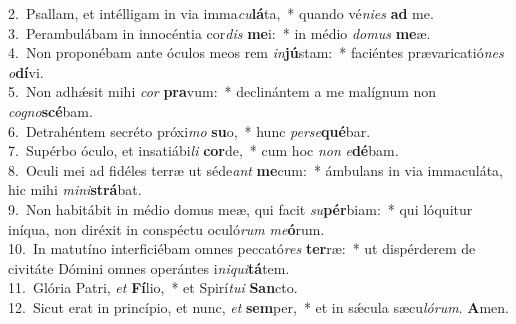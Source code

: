 {2.~}Psallam, et intélligam in via imma\textit{cu}\textbf{lá}ta,~* quando vé\textit{ni}\textit{es} \textbf{ad} me.\\
{3.~}Perambulábam in innocéntia cor\textit{dis} \textbf{me}i:~* in médio \textit{do}\textit{mus} \textbf{me}æ.\\
{4.~}Non proponébam ante óculos meos rem \textit{in}\textbf{jú}stam:~* faciéntes prævaricatió\textit{nes} \textit{o}\textbf{dí}vi.\\
{5.~}Non adhǽsit mihi \textit{cor} \textbf{pra}vum:~* declinántem a me malígnum non \textit{co}\textit{gno}\textbf{scé}bam.\\
{6.~}Detrahéntem secréto próxi\textit{mo} \textbf{su}o,~* hunc \textit{per}\textit{se}\textbf{qué}bar.\\
{7.~}Supérbo óculo, et insatiábi\textit{li} \textbf{cor}de,~* cum hoc \textit{non} \textit{e}\textbf{dé}bam.\\
{8.~}Oculi mei ad fidéles terræ ut séde\textit{ant} \textbf{me}cum:~* ámbulans in via immaculáta, hic mihi \textit{mi}\textit{ni}\textbf{strá}bat.\\
{9.~}Non habitábit in médio domus meæ, qui facit \textit{su}\textbf{pér}biam:~* qui lóquitur iníqua, non diréxit in conspéctu oculó\textit{rum} \textit{me}\textbf{ó}rum.\\
{10.~}In matutíno interficiébam omnes peccató\textit{res} \textbf{ter}ræ:~* ut dispérderem de civitáte Dómini omnes operántes i\textit{ni}\textit{qui}\textbf{tá}tem.\\
{11.~}Glória Patri, \textit{et} \textbf{Fí}lio,~* et Spirí\textit{tu}\textit{i} \textbf{San}cto.\\
{12.~}Sicut erat in princípio, et nunc, \textit{et} \textbf{sem}per,~* et in sǽcula sæcu\textit{ló}\textit{rum}. \textbf{A}men.\\
